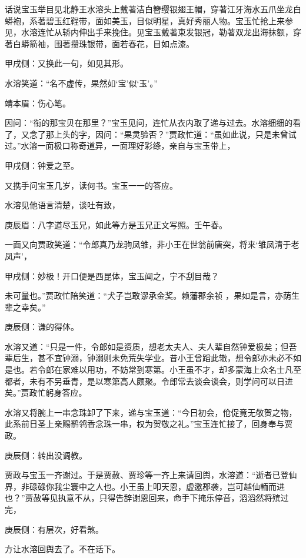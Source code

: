 \begin{parag}
    话说宝玉举目见北静王水溶头上戴著洁白簪缨银翅王帽，穿著江牙海水五爪坐龙白蟒袍，系著碧玉红鞓带，面如美玉，目似明星，真好秀丽人物。宝玉忙抢上来参见，水溶连忙从轿内伸出手来挽住。见宝玉戴著束发银冠，勒著双龙出海抹额，穿著白蟒箭袖，围著攒珠银带，面若春花，目如点漆。\begin{note}甲戌侧：又换此一句，如见其形。\end{note}水溶笑道：“名不虚传，果然如‘宝’似‘玉’。”\begin{note}靖本眉：伤心笔。\end{note}因问：“衔的那宝贝在那里？”宝玉见问，连忙从衣内取了递与过去。水溶细细的看了，又念了那上头的字，因问：“果灵验否？”贾政忙道：“虽如此说，只是未曾试过。”水溶一面极口称奇道异，一面理好彩绦，亲自与宝玉带上，\begin{note}甲戌侧：钟爱之至。\end{note}又携手问宝玉几岁，读何书。宝玉一一的答应。
\end{parag}


\begin{parag}
    水溶见他语言清楚，谈吐有致，\begin{note}庚辰眉：八字道尽玉兄，如此等方是玉兄正文写照。壬午春。\end{note}一面又向贾政笑道：“令郎真乃龙驹凤雏，非小王在世翁前唐突，将来‘雏凤清于老凤声’，\begin{note}甲戌侧：妙极！开口便是西昆体，宝玉闻之，宁不刮目哉？\end{note}未可量也。”贾政忙陪笑道：“犬子岂敢谬承金奖。赖藩郡余祯 ，果如是言，亦荫生辈之幸矣。”\begin{note}庚辰侧：谦的得体。\end{note}水溶又道：“只是一件，令郎如是资质，想老太夫人、夫人辈自然钟爱极矣；但吾辈后生，甚不宜钟溺，钟溺则未免荒失学业。昔小王曾蹈此辙，想令郎亦未必不如是也。若令郎在家难以用功，不妨常到寒第。小王虽不才，却多蒙海上众名士凡至都者，未有不另垂青，是以寒第高人颇聚。令郎常去谈会谈会，则学问可以日进矣。”贾政忙躬身答应。
\end{parag}


\begin{parag}
    水溶又将腕上一串念珠卸了下来，递与宝玉道：“今日初会，伧促竟无敬贺之物，此系前日圣上亲赐鹡鸰香念珠一串，权为贺敬之礼。”宝玉连忙接了，回身奉与贾政。\begin{note}庚辰侧：转出没调教。\end{note}贾政与宝玉一齐谢过。于是贾赦、贾珍等一齐上来请回舆，水溶道：“逝者已登仙界，非碌碌你我尘寰中之人也。小王虽上叩天恩，虚邀郡袭，岂可越仙輀而进也？”贾赦等见执意不从，只得告辞谢恩回来，命手下掩乐停音，滔滔然将殡过完，\begin{note}庚辰侧：有层次，好看煞。\end{note}方让水溶回舆去了。不在话下。
\end{parag}



